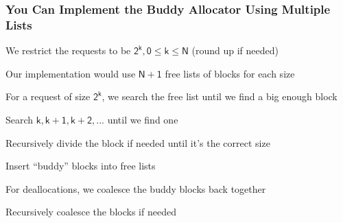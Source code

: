   \begin{frame}
    \frametitle{You Can Implement the Buddy Allocator Using Multiple Lists}
    

    We restrict the requests to be $\mathsf{2^k, 0 \leq k \leq N}$ (round up if needed)

    \vspace{2em}

    Our implementation would use $\mathsf{N+1}$ free lists of blocks for each
    size

    \hspace{2em}

    For a request of size $\mathsf{2^k}$, we search the free list until we find
    a big enough block

    \hspace{2em} Search $\mathsf{k, k+1, k+2, ...}$ until we find one

    \hspace{4em} Recursively divide the block if needed until it's the correct size

    \hspace{6em} Insert “buddy” blocks into free lists

    \vspace{2em}

    For deallocations, we coalesce the buddy blocks back together

    \hspace{2em} Recursively coalesce the blocks if needed
  \end{frame}

